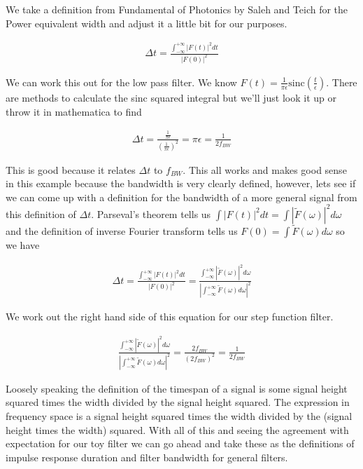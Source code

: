 \documentclass[12pt]{article}
\begin{document}
We take a definition from Fundamental of Photonics by Saleh and Teich for the Power equivalent width and adjust it a little bit for our purposes.

\begin{align}
\Delta t = \frac{\int_{-\infty}^{+\infty} |F(t)|^2 dt}{|F(0)|^2}
\end{align}

We can work this out for the low pass filter. We know $F(t) = \frac{1}{\pi \epsilon} \text{sinc}\left(\frac{t}{\epsilon}\right)$. There are methods to calculate the sinc squared integral but we'll just look it up or throw it in mathematica to find

\begin{align}
\Delta t = \frac{\frac{1}{\pi \epsilon}}{\left(\frac{1}{\pi \epsilon}\right)^2} = \pi \epsilon = \frac{1}{2 f_{BW}}
\end{align}

This is good because it relates $\Delta t$ to $f_{BW}$. This all works and makes good sense in this example because the bandwidth is very clearly defined, however, lets see if we can come up with a definition for the bandwidth of a more general signal from this definition of $\Delta t$. Parseval's theorem tells us $\int |F(t)|^2 dt = \int |\tilde{F}(\omega)|^2 d\omega$ and the definition of inverse Fourier transform tells us $F(0) = \int \tilde{F}(\omega) d\omega$ so we have

\begin{align}
\Delta t = \frac{\int_{-\infty}^{+\infty} |F(t)|^2 dt}{|F(0)|^2} = \frac{\int_{-\infty}^{+\infty} |\tilde{F}(\omega)|^2 d\omega}{\left|\int_{-\infty}^{+\infty} \tilde{F}(\omega) d\omega\right|^2}
\end{align}

We work out the right hand side of this equation for our step function filter.

\begin{align}
\frac{\int_{-\infty}^{+\infty} |\tilde{F}(\omega)|^2 d\omega}{\left|\int_{-\infty}^{+\infty} \tilde{F}(\omega) d\omega\right|^2} = \frac{2 f_{BW}}{(2 f_{BW})^2} = \frac{1}{2 f_{BW}}
\end{align}

Loosely speaking the definition of the timespan of a signal is some signal height squared times the width divided by the signal height squared. The expression in frequency space is a signal height squared times the width divided by the (signal height times the width) squared. With all of this and seeing the agreement with expectation for our toy filter we can go ahead and take these as the definitions of impulse response duration and filter bandwidth for general filters.
\end{document}
